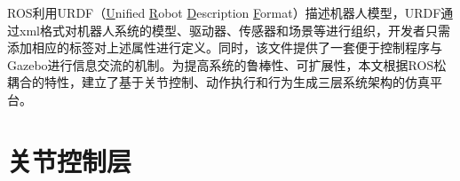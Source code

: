 ROS利用URDF（\underline{U}nified \underline{R}obot \underline{D}escription \underline{F}ormat）描述机器人模型，URDF通过xml格式对机器人系统的模型、驱动器、传感器和场景等进行组织，开发者只需添加相应的标签对上述属性进行定义。同时，该文件提供了一套便于控制程序与Gazebo进行信息交流的机制。为提高系统的鲁棒性、可扩展性，本文根据ROS松耦合的特性，建立了基于关节控制、动作执行和行为生成三层系统架构的仿真平台。

\section{关节控制层}



